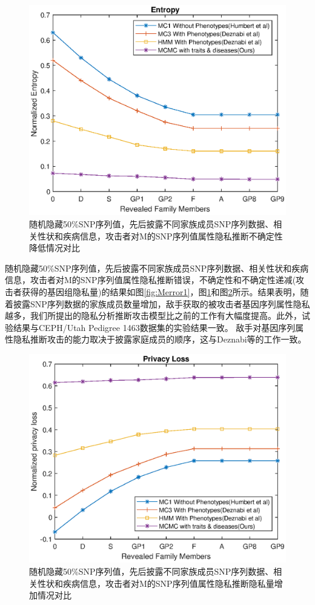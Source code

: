 \begin{figure}[htbp]
	\centering
	\includegraphics[width=0.8\linewidth]{./figures/Mentropy1.eps}
	\centering
	\caption{随机隐藏50\%SNP序列值，先后披露不同家族成员SNP序列数据、相关性状和疾病信息，攻击者对M的SNP序列值属性隐私推断不确定性降低情况对比}\label{fig:Mentropy}
\end{figure}


随机隐藏50\%SNP序列值，先后披露不同家族成员SNP序列数据、相关性状和疾病信息，攻击者对M的SNP序列值属性隐私推断错误，不确定性和不确定性递减(攻击者获得的基因组隐私量)的结果如图\ref{fig:Merror1}，图\ref{fig:Mentropy}和图\ref{fig:Mprivacyloss}所示。结果表明，随着披露SNP序列数据的家族成员数量增加，敌手获取的被攻击者基因序列属性隐私越多，我们所提出的隐私分析推断攻击模型比之前的工作有大幅度提高。此外，试验结果与CEPH/Utah Pedigree 1463数据集的实验结果一致。 敌手对基因序列属性隐私推断攻击的能力取决于披露家庭成员的顺序，这与Deznabi等的工作一致。

\begin{figure}[htbp]
	\centering
	\includegraphics[width=0.8\linewidth]{./figures/Mprivacyloss.eps}
	\centering
	\caption{随机隐藏50\%SNP序列值，先后披露不同家族成员SNP序列数据、相关性状和疾病信息，攻击者对M的SNP序列值属性隐私推断隐私量增加情况对比}\label{fig:Mprivacyloss}
\end{figure}

